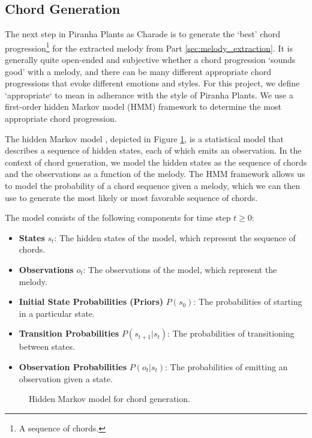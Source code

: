 \subsection{Chord Generation}
\label{sec:chord_generation}

The next step in Piranha Plants as Charade is to generate the `best' chord progression\footnote{A sequence of chords.} for the extracted melody from Part \ref{sec:melody_extraction}. It is generally quite open-ended and subjective whether a chord progression `sounds good' with a melody, and there can be many different appropriate chord progressions that evoke different emotions and styles. For this project, we define `appropriate` to mean in adherance with the style of Piranha Plants. We use a first-order hidden Markov model (HMM) framework to determine the most appropriate chord progression.

The hidden Markov model \autocite{HMM:2023,SpeechLang:2025}, depicted in Figure \ref{fig:hmm}, is a statistical model that describes a sequence of hidden states, each of which emits an observation. In the context of chord generation, we model the hidden states as the sequence of chords and the observations as a function of the melody. The HMM framework allows us to model the probability of a chord sequence given a melody, which we can then use to generate the most likely or most favorable sequence of chords.

The model consists of the following components for time step $t \geq 0$:
\begin{itemize}
    \item \textbf{States} $s_t$: The hidden states of the model, which represent the sequence of chords.
    \item \textbf{Observations} $o_t$: The observations of the model, which represent the melody.
    \item \textbf{Initial State Probabilities (Priors)} $P(s_0)$: The probabilities of starting in a particular state.
    \item \textbf{Transition Probabilities} $P(s_{t+1} | s_t)$: The probabilities of transitioning between states.
    \item \textbf{Observation Probabilities} $P(o_t | s_t)$: The probabilities of emitting an observation given a state.
\end{itemize}

\begin{figure}
    \resizebox{\linewidth}{!}{}
    \caption{Hidden Markov model for chord generation.}
    \label{fig:hmm}
\end{figure}

